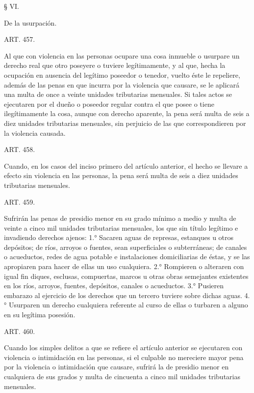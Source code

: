     § VI.

    De la usurpación.





    ART. 457.

    Al que con violencia en las personas ocupare una cosa inmueble o usurpare un derecho real que otro poseyere o tuviere legítimamente, y al que, hecha la ocupación en ausencia del legítimo poseedor o tenedor, vuelto éste le repeliere, además de las penas en que incurra por la violencia que causare, se le aplicará una multa de once a veinte unidades tributarias mensuales.
    Si tales actos se ejecutaren por el dueño o poseedor regular contra el que posee o tiene ilegítimamente la cosa, aunque con derecho aparente, la pena será multa de seis a diez unidades tributarias mensuales, sin perjuicio de las que correspondieren por la violencia causada.






    ART. 458.

    Cuando, en los casos del inciso primero del artículo anterior, el hecho se llevare a efecto sin violencia en las personas, la pena será multa de seis a diez unidades tributarias mensuales.









    ART. 459.

    Sufrirán las penas de presidio menor en su grado mínimo a medio y multa de veinte a cinco mil unidades tributarias mensuales, los que sin título legítimo e invadiendo derechos ajenos:
    1.° Sacaren aguas de represas, estanques u otros depósitos; de ríos, arroyos o fuentes, sean superficiales o subterráneas; de canales o acueductos, redes de agua potable e instalaciones domiciliarias de éstas, y se las apropiaren para hacer de ellas un uso cualquiera.
    2.° Rompieren o alteraren con igual fin diques, esclusas, compuertas, marcos u otras obras semejantes existentes en los ríos, arroyos, fuentes, depósitos, canales o acueductos.
    3.° Pusieren embarazo al ejercicio de los derechos que un tercero tuviere sobre dichas aguas.
    4.° Usurparen un derecho cualquiera referente al curso de ellas o turbaren a alguno en su legítima posesión.


    ART. 460.

    Cuando los simples delitos a que se refiere el artículo anterior se ejecutaren con violencia o intimidación en las personas, si el culpable no mereciere mayor pena por la violencia o intimidación que causare, sufrirá la de presidio menor en cualquiera de sus grados y multa de cincuenta a cinco mil unidades tributarias mensuales.









